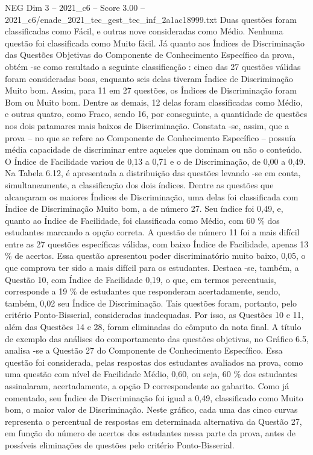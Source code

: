 \begin{textsample}{NEG Dim 3 – 2021\_c6 – Score 3.00 – 2021\_c6/enade\_2021\_tec\_gest\_tec\_inf\_2a1ac18999.txt}
Duas questões foram classificadas como Fácil, e outras nove consideradas como Médio.
Nenhuma questão foi classificada como Muito fácil.
Já quanto aos Índices de Discriminação das Questões Objetivas do Componente de Conhecimento Específico da prova, obtém -se como resultado a seguinte classificação : cinco das 27 questões válidas foram consideradas boas, enquanto seis delas tiveram Índice de Discriminação Muito bom.
Assim, para 11 em 27 questões, os Índices de Discriminação foram Bom ou Muito bom.
Dentre as demais, 12 delas foram classificadas como Médio, e outras quatro, como Fraco, sendo 16, por conseguinte, a quantidade de questões nos dois patamares mais baixos de Discriminação.
Constata -se, assim, que a prova – no que se refere ao Componente de Conhecimento Específico – possuía média capacidade de discriminar entre aqueles que dominam ou não o conteúdo.
O Índice de Facilidade variou de 0,13 a 0,71 e o de Discriminação, de 0,00 a 0,49.
Na Tabela 6.12, é apresentada a distribuição das questões levando -se em conta, simultaneamente, a classificação dos dois índices.
Dentre as questões que alcançaram os maiores Índices de Discriminação, uma delas foi classificada com Índice de Discriminação Muito bom, a de número 27.
Seu índice foi 0,49, e, quanto ao Índice de Facilidade, foi classificada como Médio, com 60 \% dos estudantes marcando a opção correta.
A questão de número 11 foi a mais difícil entre as 27 questões específicas válidas, com baixo Índice de Facilidade, apenas 13 \% de acertos.
Essa questão apresentou poder discriminatório muito baixo, 0,05, o que comprova ter sido a mais difícil para os estudantes.
Destaca -se, também, a Questão 10, com Índice de Facilidade 0,19, o que, em termos percentuais, corresponde a 19 \% de estudantes que responderam acertadamente, sendo, também, 0,02 seu Índice de Discriminação.
Tais questões foram, portanto, pelo critério Ponto-Bisserial, consideradas inadequadas.
Por isso, as Questões 10 e 11, além das Questões 14 e 28, foram eliminadas do cômputo da nota final.
A título de exemplo das análises do comportamento das questões objetivas, no Gráfico 6.5, analisa -se a Questão 27 do Componente de Conhecimento Específico.
Essa questão foi considerada, pelas respostas dos estudantes avaliados na prova, como uma questão com nível de Facilidade Médio, 0,60, ou seja, 60 \% dos estudantes assinalaram, acertadamente, a opção D correspondente ao gabarito.
Como já comentado, seu Índice de Discriminação foi igual a 0,49, classificado como Muito bom, o maior valor de Discriminação.
Neste gráfico, cada uma das cinco curvas representa o percentual de respostas em determinada alternativa da Questão 27, em função do número de acertos dos estudantes nessa parte da prova, antes de possíveis eliminações de questões pelo critério Ponto-Bisserial.

\end{textsample}
